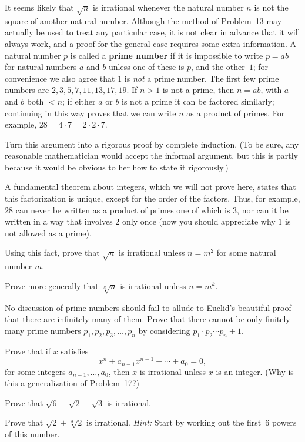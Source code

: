  It seems likely that $\sqrt{n}$ is irrational whenever the natural
number $n$ is not the square of another natural number. Although the method
of Problem~13 may actually be used to treat any particular case, it is not
clear in advance that it will always work, and a proof for the general case
requires some extra information. A natural number $p$ is called a
\textbf{prime number} if it is impossible to write $p = ab$ for natural
numbers $a$ and $b$ unless one of these is $p$, and the other~$1$; for
convenience we also agree that $1$ is \emph{not} a prime number. The first
few prime numbers are $2, 3, 5, 7, 11, 13, 17, 19$. If $n > 1$ is not a
prime, then $n = ab$, with $a$ and $b$ both $< n$; if either $a$ or $b$ is
not a prime it can be factored similarly; continuing in this way proves that
we can write $n$ as a product of primes. For example,
$28 = 4 \cdot 7 = 2 \cdot 2 \cdot 7$.

\begin{letters}
\item Turn this argument into a rigorous proof by complete induction. (To be
  sure, any reasonable mathematician would accept the informal argument, but
  this is partly because it would be obvious to her how to state it
  rigorously.)
\end{letters}

A fundamental theorem about integers, which we will not prove here, states
that this factorization is unique, except for the order of the factors. Thus,
for example, $28$ can never be written as a product of primes one of which is
$3$, nor can it be written in a way that involves $2$ only once (now you
should appreciate why $1$ is not allowed as a prime).

\begin{letters}[start=2]
\item Using this fact, prove that $\sqrt{n}$ is irrational unless $n = m^2$
  for some natural number $m$.
\item Prove more generally that $\sqrt[k]{n}$ is irrational unless $n = m^k$.
\item No discussion of prime numbers should fail to allude to Euclid's
  beautiful proof that there are infinitely many of them. Prove that there
  cannot be only finitely many prime numbers $p_1, p_2, p_3, \dots, p_n$ by
  considering $p_1 \cdot p_2 \cdots p_n + 1$.
\end{letters}

\begin{letters}
\item Prove that if $x$ satisfies
\[ x^n + a_{n-1} x^{n-1} + \cdots + a_0 = 0, \]
for some integers $a_{n-1}, \dots, a_0$, then $x$ is irrational unless $x$ is
an integer. (Why is this a generalization of Problem~17?)
\item Prove that $\sqrt{6} - \sqrt{2} - \sqrt{3}$ is irrational.
\item Prove that $\sqrt{2} + \sqrt[3]{2}$ is irrational. \textit{Hint:} Start
  by working out the first~$6$ powers of this number.
\end{letters}

